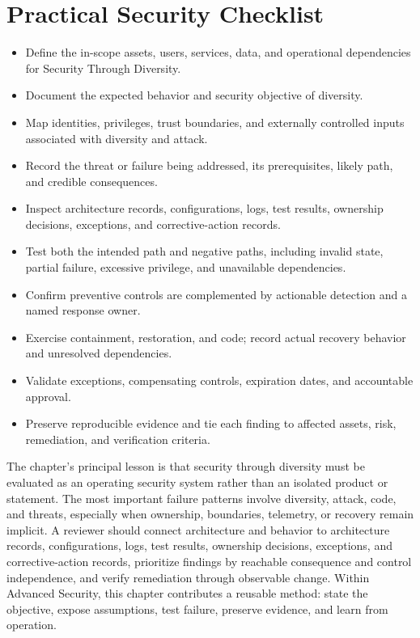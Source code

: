 \documentclass[11pt]{article}
\begin{document}
\section*{Practical Security Checklist}
\begin{itemize}[label=$\square$]
\item Define the in-scope assets, users, services, data, and operational dependencies for Security Through Diversity.
\item Document the expected behavior and security objective of diversity.
\item Map identities, privileges, trust boundaries, and externally controlled inputs associated with diversity and attack.
\item Record the threat or failure being addressed, its prerequisites, likely path, and credible consequences.
\item Inspect architecture records, configurations, logs, test results, ownership decisions, exceptions, and corrective-action records.
\item Test both the intended path and negative paths, including invalid state, partial failure, excessive privilege, and unavailable dependencies.
\item Confirm preventive controls are complemented by actionable detection and a named response owner.
\item Exercise containment, restoration, and code; record actual recovery behavior and unresolved dependencies.
\item Validate exceptions, compensating controls, expiration dates, and accountable approval.
\item Preserve reproducible evidence and tie each finding to affected assets, risk, remediation, and verification criteria.
\end{itemize}
\begin{synthesisbox}
The chapter's principal lesson is that security through diversity must be evaluated as an operating security system rather than an isolated product or statement. The most important failure patterns involve diversity, attack, code, and threats, especially when ownership, boundaries, telemetry, or recovery remain implicit. A reviewer should connect architecture and behavior to architecture records, configurations, logs, test results, ownership decisions, exceptions, and corrective-action records, prioritize findings by reachable consequence and control independence, and verify remediation through observable change. Within Advanced Security, this chapter contributes a reusable method: state the objective, expose assumptions, test failure, preserve evidence, and learn from operation.
\end{synthesisbox}
\end{document}
